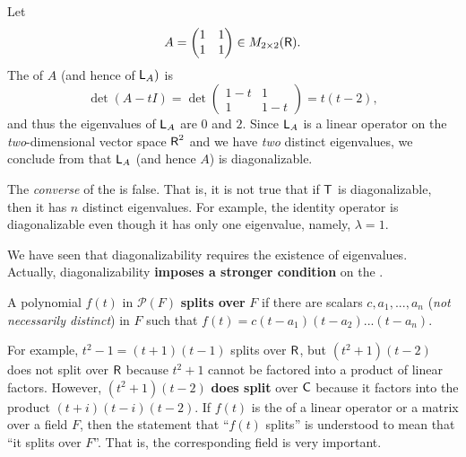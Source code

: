 \begin{example} \label{example 5.2.1}
Let
\[
    A = \begin{pmatrix} 1 & 1 \\ 1 & 1 \end{pmatrix} \in M_{2 \times 2}(\textsf{R}).
\]
The \CPOLY{} of \(A\) (and hence of \(\textsf{L}_A)\) is
\[
    \det(A - tI) = \det \begin{pmatrix} 1 - t & 1 \\ 1 & 1 - t \end{pmatrix} = t(t - 2),
\]
and thus the eigenvalues of \(\textsf{L}_A\) are \(0\) and \(2\).
Since \(\textsf{L}_A\) is a linear operator on the \emph{two}-dimensional vector space \(\textsf{R}^2\) and we have \emph{two} distinct eigenvalues, we conclude from  that \(\textsf{L}_A\) (and hence \(A\)) is diagonalizable.
\end{example}

\begin{remark} \label{remark 5.2.1}
The \emph{converse} of the  is false.
That is, it is not true that if \(\textsf{T}\) is diagonalizable, then it has \(n\) distinct eigenvalues.
For example, the identity operator is diagonalizable even though it has only one eigenvalue, namely, \(\lambda = 1\).
\end{remark}

We have seen that diagonalizability requires the existence of eigenvalues.
Actually, diagonalizability \textbf{imposes a stronger condition} on the \CPOLY{}.

\begin{definition} \label{def 5.5}
A polynomial \(f(t)\) in \(\mathcal{P}(F)\) \textbf{splits over} \(F\) if there are scalars \(c, a_1, ..., a_n\) (\emph{not necessarily distinct}) in \(F\) such that \(f(t) = c(t - a_1)(t - a_2) ... (t - a_n)\).
\end{definition}

\begin{remark} \label{remark 5.2.2}
For example, \(t^2 - 1 = (t + 1)(t - 1)\) splits over \(\textsf{R}\), but \((t^2 + 1)(t - 2)\) does not split over \(\textsf{R}\) because \(t^2 + 1\) cannot be factored into a product of linear factors.
However, \((t^2 + 1)(t - 2)\) \textbf{does split} over \(\textsf{C}\) because it factors into the product \((t + i)(t - i)(t - 2)\).
If \(f(t)\) is the \CPOLY{} of a linear operator or a matrix over a field \(F\), then the statement that ``\(f(t)\) splits'' is understood to mean that ``it splits over \(F\)''.
That is, the corresponding field is very important.
\end{remark}


